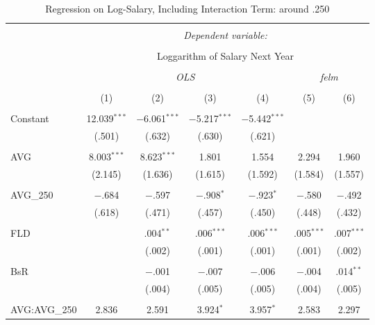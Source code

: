 
\begin{table}[H] \centering
  \caption{Regression on Log-Salary, Including Interaction Term: around .250}
  \label{AVG250_A}
\tiny
\begin{tabular}{@{\extracolsep{5pt}}lcccccc}
\\[-1.8ex]\hline
\hline \\[-1.8ex]
 & \multicolumn{6}{c}{\textit{Dependent variable:}} \\
\cline{2-7}
\\[-1.8ex] & \multicolumn{6}{c}{Loggarithm of Salary Next Year} \\
\\[-1.8ex] & \multicolumn{4}{c}{\textit{OLS}} & \multicolumn{2}{c}{\textit{felm}} \\
\\[-1.8ex] & (1) & (2) & (3) & (4) & (5) & (6)\\
\hline \\[-1.8ex]
 Constant & 12.039$^{***}$ & $-$6.061$^{***}$ & $-$5.217$^{***}$ & $-$5.442$^{***}$ &  &  \\
  & (.501) & (.632) & (.630) & (.621) &  &  \\
  & & & & & & \\
 AVG & 8.003$^{***}$ & 8.623$^{***}$ & 1.801 & 1.554 & 2.294 & 1.960 \\
  & (2.145) & (1.636) & (1.615) & (1.592) & (1.584) & (1.557) \\
  & & & & & & \\
 AVG\_250 & $-$.684 & $-$.597 & $-$.908$^{*}$ & $-$.923$^{*}$ & $-$.580 & $-$.492 \\
  & (.618) & (.471) & (.457) & (.450) & (.448) & (.432) \\
  & & & & & & \\
 FLD &  & .004$^{**}$ & .006$^{***}$ & .006$^{***}$ & .005$^{***}$ & .007$^{***}$ \\
  &  & (.002) & (.001) & (.001) & (.001) & (.002) \\
  & & & & & & \\
 BsR &  & $-$.001 & $-$.007 & $-$.006 & $-$.004 & .014$^{**}$ \\
  &  & (.004) & (.005) & (.005) & (.004) & (.005) \\
  & & & & & & \\
 AVG:AVG\_250 & 2.836 & 2.591 & 3.924$^{*}$ & 3.957$^{*}$ & 2.583 & 2.297 \\

\end{tabular}
\end{table}

